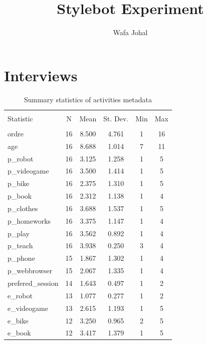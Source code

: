 \documentclass{article}
\title{Stylebot Experiment}
\author{Wafa Johal}
\begin{document}
\tableofcontents



\maketitle




\section{Interviews}
\begin{table}[!htbp] \centering 
  \caption{Summary statistics of activities metadata} 
  \label{} 
\begin{tabular}{@{\extracolsep{5pt}}lccccc} 
\\[-1.8ex]\hline 
\hline \\[-1.8ex] 
Statistic & \multicolumn{1}{c}{N} & \multicolumn{1}{c}{Mean} & \multicolumn{1}{c}{St. Dev.} & \multicolumn{1}{c}{Min} & \multicolumn{1}{c}{Max} \\ 
\hline \\[-1.8ex] 
ordre & 16 & 8.500 & 4.761 & 1 & 16 \\ 
age & 16 & 8.688 & 1.014 & 7 & 11 \\ 
p\_robot & 16 & 3.125 & 1.258 & 1 & 5 \\ 
p\_videogame & 16 & 3.500 & 1.414 & 1 & 5 \\ 
p\_bike & 16 & 2.375 & 1.310 & 1 & 5 \\ 
p\_book & 16 & 2.312 & 1.138 & 1 & 4 \\ 
p\_clothes & 16 & 3.688 & 1.537 & 1 & 5 \\ 
p\_homeworks & 16 & 3.375 & 1.147 & 1 & 4 \\ 
p\_play & 16 & 3.562 & 0.892 & 1 & 4 \\ 
p\_teach & 16 & 3.938 & 0.250 & 3 & 4 \\ 
p\_phone & 15 & 1.867 & 1.302 & 1 & 4 \\ 
p\_webbrowser & 15 & 2.067 & 1.335 & 1 & 4 \\ 
prefered\_session & 14 & 1.643 & 0.497 & 1 & 2 \\ 
e\_robot & 13 & 1.077 & 0.277 & 1 & 2 \\ 
e\_videogame & 13 & 2.615 & 1.193 & 1 & 5 \\ 
e\_bike & 12 & 3.250 & 0.965 & 2 & 5 \\ 
e\_book & 12 & 3.417 & 1.379 & 1 & 5 \\ 

\end{tabular}
\end{table}
\end{document}
